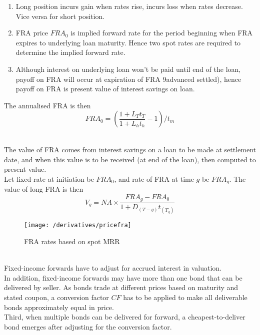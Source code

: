 \begin{method} 
\begin{enumerate}[label=\roman*.]
\setlength{\itemsep}{0pt}
\item Long position incurs gain when rates rise, incurs loss when rates decrease. Vice versa for short position.
\item FRA price $FRA_0$ is implied forward rate for the period beginning when FRA expires to underlying loan maturity. Hence two spot rates are required to determine the implied forward rate.
\item Although interest on underlying loan won't be paid until end of the loan, payoff on FRA will occur at expiration of FRA 9advanced settled), hence payoff on FRA is present value of interest savings on loan.
\end{enumerate}
The annualised FRA is then
\begin{equation}
FRA_0 = \left(\frac{1 + L_T t_T}{1 + L_h t_h} - 1 \right)/t_m \nonumber
\end{equation}
\end{method}

\begin{method} \\
The value of FRA comes from interest savings on a loan to be made at settlement date, and when this value is to be received (at end of the loan), then computed to present value.\\
Let fixed-rate at initiation be $FRA_0$, and rate of FRA at time $g$ be $FRA_g$. The value of long FRA is then
\begin{equation}
V_g = NA \times \frac{FRA_g - FRA_0}{1 + D_{(T-g)} t_{(T_g)}} \nonumber
\end{equation}
\end{method}

\begin{figure}[H]
\centering
\texttt{[image: /derivatives/pricefra]}
\caption{FRA rates based on spot MRR}
\end{figure}

\begin{remark} \\
Fixed-income forwards have to adjust for accrued interest in valuation.\\
In addition, fixed-income forwards may have more than one bond that can be delivered by seller. As bonds trade at different prices based on maturity and stated coupon, a conversion factor $CF$ has to be applied to make all deliverable bonds approximately equal in price.\\
Third, when multiple bonds can be delivered for forward, a cheapest-to-deliver bond emerges after adjusting for the conversion factor.
\end{remark}

